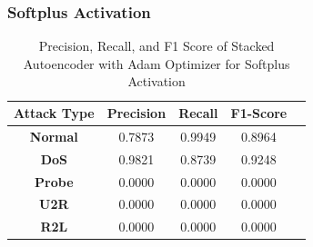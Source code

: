\documentclass[12pt, a4paper]{report}
\begin{document}
\subsubsection{Softplus Activation}
\begin{table}[ht]
\centering
\captionsetup{justification=centering,margin=2cm}
\begin{tabular}{|c|c|c|c|c|}
\hline
\multicolumn{1}{|c|}{\textbf{Attack Type}} & \multicolumn{1}{c|}{\textbf{Precision}} & \multicolumn{1}{c|}{\textbf{Recall}} & \multicolumn{1}{c|}{\textbf{F1-Score}} \\ \hline
\textbf{Normal}        & 0.7873                                   & 0.9949                                & 0.8964                                                                  \\ \hline
\textbf{DoS}           & 0.9821                                  & 0.8739                                &  0.9248                                                                    \\ \hline
\textbf{Probe}         & 0.0000                                  & 0.0000                                & 0.0000                                                                  \\ \hline
\textbf{U2R}           & 0.0000                                    & 0.0000                                & 0.0000                                                                   \\ \hline
\textbf{R2L}           & 0.0000                                      & 0.0000                                   & 0.0000                                                            \\ \hline         \end{tabular}
\caption{Precision, Recall, and F1 Score of Stacked Autoencoder with Adam Optimizer for Softplus Activation}
\label{prf1_adam_softplus_auto}
\end{table}

\clearpage
\end{document}
